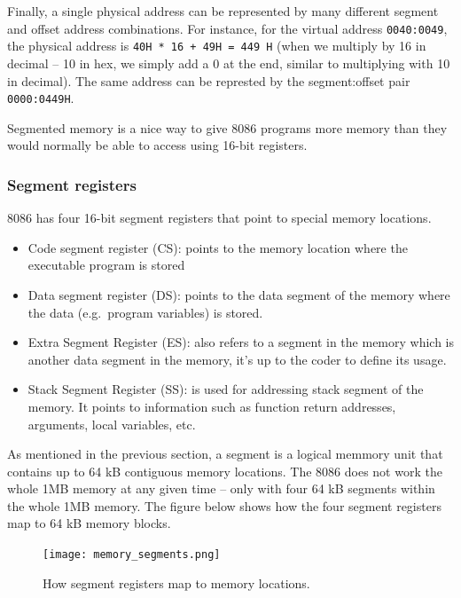 \documentclass[a4paper]{article}
\begin{document}
Finally, a single physical address can be represented by many different segment and offset address combinations. For instance, for the virtual address \texttt{0040:0049}, the physical address is \texttt{40H * 16 + 49H = 449 H} (when we multiply by 16 in decimal -- 10 in hex, we simply add a 0 at the end, similar to multiplying with 10 in decimal). The same address can be represted by the segment:offset pair \texttt{0000:0449H}.

Segmented memory is a nice way to give 8086 programs more memory than they would normally be able to access using 16-bit registers.
%

\subsubsection{Segment registers}

8086 has four 16-bit segment registers that point to special memory locations.

\begin{itemize}
	\item Code segment register (CS): points to the memory location where the executable program is stored
	\item Data segment register (DS): points to the data segment of the memory where the data (e.g.\ program variables) is stored.
	\item Extra Segment Register (ES): also refers to a segment in the memory which is another data segment in the memory, it's up to the coder to define its usage.
	\item Stack Segment Register (SS): is used for addressing stack segment of the memory. It points to information such as function return addresses, arguments, local variables, etc. 
\end{itemize}

As mentioned in the previous section, a segment is a logical memmory unit that contains up to 64 kB contiguous memory locations. The 8086 does not work the whole 1MB memory at any given time -- only with four 64 kB segments within the whole 1MB memory. The figure below shows how the four segment registers map to 64 kB memory blocks. 

\begin{figure}[H]
	\centering
	\texttt{[image: memory\_segments.png]}
	\caption{How segment registers map to memory locations.}
\end{figure}
\end{document}
